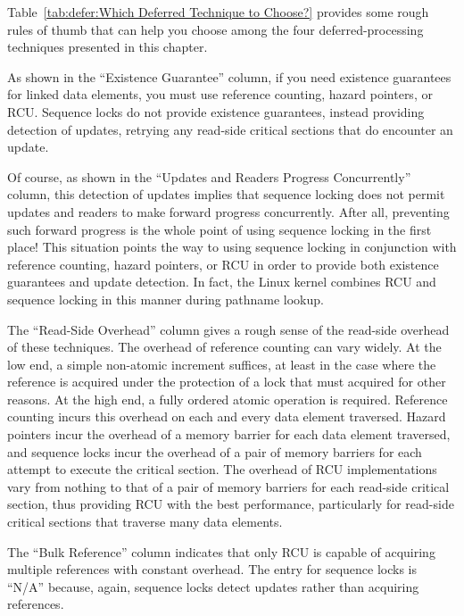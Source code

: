 Table~\ref{tab:defer:Which Deferred Technique to Choose?}
provides some rough rules of thumb that can help you choose among the
four deferred-processing techniques presented in this chapter.

As shown in the ``Existence Guarantee'' column,
if you need existence guarantees for linked
data elements, you must use reference counting, hazard pointers, or RCU.
Sequence locks do not provide existence guarantees, instead providing
detection of updates, retrying any read-side critical sections
that do encounter an update.

Of course, as shown in the ``Updates and Readers Progress Concurrently''
column, this detection of updates implies
that sequence locking does not permit updates and readers to make forward
progress concurrently.
After all, preventing such forward progress is the whole point of using
sequence locking in the first place!
This situation points the way to using sequence locking in conjunction
with reference counting, hazard pointers, or RCU in order to provide
both existence guarantees and update detection.
In fact, the Linux kernel combines RCU and sequence locking in
this manner during pathname lookup.

The ``Read-Side Overhead'' column gives a rough sense of the read-side
overhead of these techniques.
The overhead of reference counting can vary widely.
At the low end, a simple non-atomic increment suffices, at least in the
case where the reference is acquired under the protection of a lock
that must acquired for other reasons.
At the high end, a fully ordered atomic operation is required.
Reference counting incurs this overhead on each and every data element
traversed.
Hazard pointers incur the overhead of a memory barrier for each data element
traversed, and sequence locks incur the overhead of a pair of memory barriers
for each attempt to execute the critical section.
The overhead of RCU implementations vary from nothing to that of a pair of
memory barriers for each read-side critical section, thus providing RCU
with the best performance, particularly for read-side critical sections
that traverse many data elements.

The ``Bulk Reference'' column indicates that only RCU is capable of acquiring
multiple references with constant overhead.
The entry for sequence locks is ``N/A'' because, again, sequence locks
detect updates rather than acquiring references.


